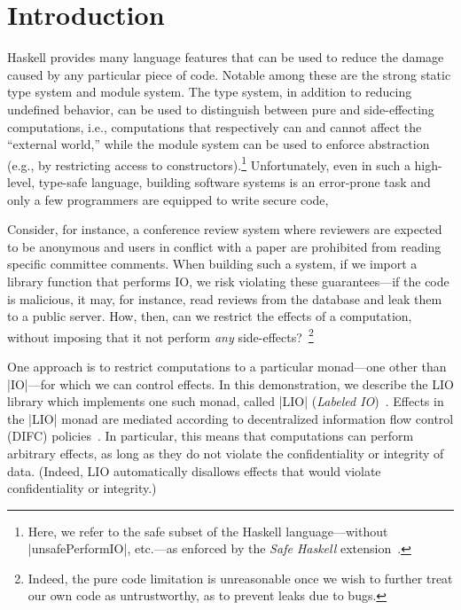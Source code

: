 \section{Introduction}
\label{sec:intro}

Haskell provides many language features that can be used to reduce the
damage caused by any particular piece of code.
%
Notable among these are the strong static type system and module
system.
%
The type system, in addition to reducing undefined behavior, can be
used to distinguish between pure and side-effecting computations,
i.e., computations that respectively can and cannot affect the
``external world,'' while the module system can be used to enforce
abstraction (e.g., by restricting access to constructors).\footnote{
  Here, we refer to the safe subset of the Haskell language---without
  \hs|unsafePerformIO|, etc.---as enforced by
  the \emph{Safe Haskell} extension~\cite{safehaskell}.
}
%
Unfortunately, even in such a high-level, type-safe language, building
software systems is an error-prone task and only a few programmers are
equipped to write secure code,
 
Consider, for instance, a conference review system where reviewers are
expected to be anonymous and users in conflict with a paper are
prohibited from reading specific committee comments.
%
When building such a system, if we import a library function that
performs IO, we risk violating these guarantees---if the code is
malicious, it may, for instance, read reviews from the database and
leak them to a public server.
%
How, then, can we restrict the effects of a computation, without
imposing that it not perform \emph{any} side-effects?~\footnote{
  Indeed, the pure code limitation is unreasonable once we wish to
  further treat our own code as untrustworthy, as to prevent leaks due
  to bugs.
}

One approach is to restrict computations to a particular monad---one
other than \hs|IO|---for which we can control effects.
%
In this demonstration, we describe the LIO library which implements
one such monad, called \hs|LIO| (\emph{Labeled IO})~\cite{lio,
concurrent-lio}.
%
Effects in the \hs|LIO| monad are mediated according to
decentralized information flow control (DIFC)
policies~\cite{myers:dlm, sabelfeld:language-based-iflow}.
%
In particular, this means that computations can perform arbitrary
effects, as long as they do not violate the confidentiality or
integrity of data.
%
(Indeed, LIO automatically disallows effects that would violate
confidentiality or integrity.)
